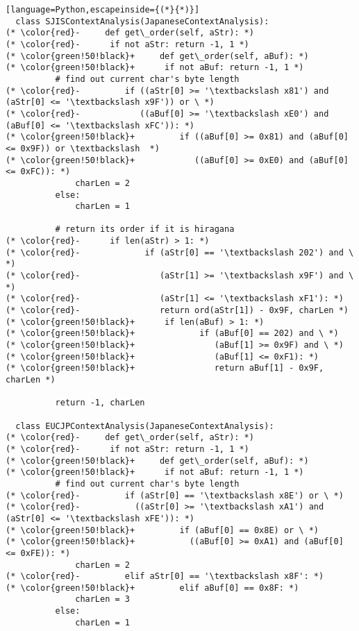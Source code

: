 \begin{lstlisting}[language=Python,escapeinside={(*}{*)}]
  class SJISContextAnalysis(JapaneseContextAnalysis):
(* \color{red}-     def get\_order(self, aStr): *)
(* \color{red}-      if not aStr: return -1, 1 *)
(* \color{green!50!black}+     def get\_order(self, aBuf): *)
(* \color{green!50!black}+      if not aBuf: return -1, 1 *)
          # find out current char's byte length
(* \color{red}-         if ((aStr[0] >= '\textbackslash x81') and (aStr[0] <= '\textbackslash x9F')) or \ *)
(* \color{red}-            ((aBuf[0] >= '\textbackslash xE0') and (aBuf[0] <= '\textbackslash xFC')): *)
(* \color{green!50!black}+         if ((aBuf[0] >= 0x81) and (aBuf[0] <= 0x9F)) or \textbackslash  *)
(* \color{green!50!black}+            ((aBuf[0] >= 0xE0) and (aBuf[0] <= 0xFC)): *)
              charLen = 2
          else:
              charLen = 1

          # return its order if it is hiragana
(* \color{red}-      if len(aStr) > 1: *)
(* \color{red}-             if (aStr[0] == '\textbackslash 202') and \ *)
(* \color{red}-                (aStr[1] >= '\textbackslash x9F') and \ *)
(* \color{red}-                (aStr[1] <= '\textbackslash xF1'): *)
(* \color{red}-                return ord(aStr[1]) - 0x9F, charLen *)
(* \color{green!50!black}+      if len(aBuf) > 1: *)
(* \color{green!50!black}+             if (aBuf[0] == 202) and \ *)
(* \color{green!50!black}+                (aBuf[1] >= 0x9F) and \ *)
(* \color{green!50!black}+                (aBuf[1] <= 0xF1): *)
(* \color{green!50!black}+                return aBuf[1] - 0x9F, charLen *)

          return -1, charLen

  class EUCJPContextAnalysis(JapaneseContextAnalysis):
(* \color{red}-     def get\_order(self, aStr): *)
(* \color{red}-      if not aStr: return -1, 1 *)
(* \color{green!50!black}+     def get\_order(self, aBuf): *)
(* \color{green!50!black}+      if not aBuf: return -1, 1 *)
          # find out current char's byte length
(* \color{red}-         if (aStr[0] == '\textbackslash x8E') or \ *)
(* \color{red}-           ((aStr[0] >= '\textbackslash xA1') and (aStr[0] <= '\textbackslash xFE')): *)
(* \color{green!50!black}+         if (aBuf[0] == 0x8E) or \ *)
(* \color{green!50!black}+           ((aBuf[0] >= 0xA1) and (aBuf[0] <= 0xFE)): *)
              charLen = 2
(* \color{red}-         elif aStr[0] == '\textbackslash x8F': *)
(* \color{green!50!black}+         elif aBuf[0] == 0x8F: *)
              charLen = 3
          else:
              charLen = 1


\end{lstlisting}

